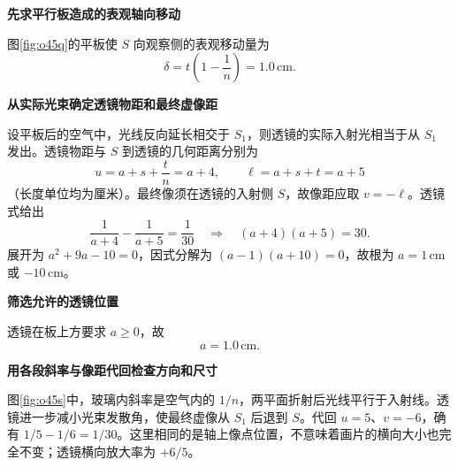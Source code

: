 \begin{solution}\textbf{先求平行板造成的表观轴向移动}\par\nobreak
图\ref{fig:o45q}的平板使 \(S\) 向观察侧的表观移动量为
\[
 \delta=t\left(1-\frac1n\right)=1.0\,\mathrm{cm}.
\]


\par\medskip{}\noindent\textbf{从实际光束确定透镜物距和最终虚像距}\par\nobreak
设平板后的空气中，光线反向延长相交于 \(S_1\)，则透镜的实际入射光相当于从 \(S_1\) 发出。透镜物距与 \(S\) 到透镜的几何距离分别为
\[
 u=a+s+\frac tn=a+4,\qquad \ell=a+s+t=a+5
\]
（长度单位均为厘米）。最终像须在透镜的入射侧 \(S\)，故像距应取 \(v=-\ell\)。透镜式给出
\[
 \frac1{a+4}-\frac1{a+5}=\frac1{30}
 \quad\Longrightarrow\quad (a+4)(a+5)=30.
\]
展开为 $a^2+9a-10=0$，因式分解为 $(a-1)(a+10)=0$，故根为 \(a=1\,\mathrm{cm}\) 或 \(-10\,\mathrm{cm}\)。



\par\medskip{}\noindent\textbf{筛选允许的透镜位置}\par\nobreak
透镜在板上方要求 \(a\ge0\)，故
\[
 \boxed{a=1.0\,\mathrm{cm}}.
\]



\par\medskip{}\noindent\textbf{用各段斜率与像距代回检查方向和尺寸}\par\nobreak
图\ref{fig:o45s}中，玻璃内斜率是空气内的 \(1/n\)，两平面折射后光线平行于入射线。透镜进一步减小光束发散角，使最终虚像从 \(S_1\) 后退到 \(S\)。代回 \(u=5\)、\(v=-6\)，确有 \(1/5-1/6=1/30\)。这里相同的是轴上像点位置，不意味着画片的横向大小也完全不变；透镜横向放大率为 \(+6/5\)。

\end{solution}

